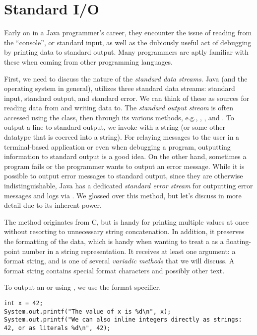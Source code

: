 \section{Standard I/O}
Early on in a Java programmer's career, they encounter the issue of reading from the ``console'', or standard input, as well as the dubiously useful act of debugging by printing data to standard output. Many programmers are aptly familiar with these when coming from other programming languages.

First, we need to discuss the nature of the \textit{standard data streams}. Java (and the operating system in general), utilizes three standard data streams: standard input, standard output, and standard error. We can think of these as sources for reading data from and writing data to. The \textit{standard output stream} is often accessed using the  class, then through its various methods, e.g., , , and . To output a line to standard output, we invoke  with a string (or some other datatype that is coerced into a string). For relaying messages to the user in a terminal-based application or even when debugging a program, outputting information to standard output is a good idea. On the other hand, sometimes a program fails or the programmer wants to output an error message. While it is possible to output error messages to standard output, since they are otherwise indistinguishable, Java has a dedicated \textit{standard error stream} for outputting error messages and logs via . We glossed over this method, but let's discuss  in more detail due to its inherent power.

The  method originates from C, but is handy for printing multiple values at once without resorting to unnecessary string concatenation. In addition, it preserves the formatting of the data, which is handy when wanting to treat a  as a floating-point number in a string representation. It receives at least one argument: a format string, and is one of several \textit{variadic methods} that we will discuss. A format string contains special format characters and possibly other text. 

\example To output an  or  using , we use the  format specifier.
\begin{verbatim}
int x = 42;
System.out.printf("The value of x is %d\n", x);
System.out.printf("We can also inline integers directly as strings: 42, or as literals %d\n", 42);
\end{verbatim}

